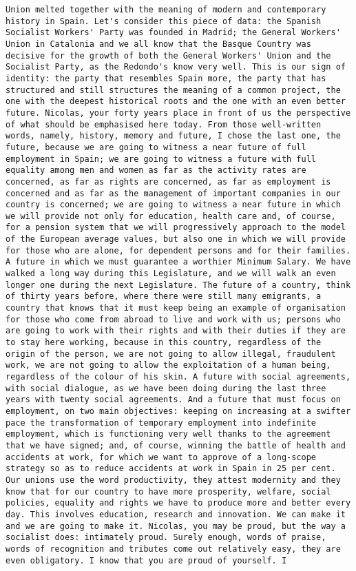 \documentclass[
]{article}
\begin{document}
\begin{verbatim}
Union melted together with the meaning of modern and contemporary history in Spain. Let's consider this piece of data: the Spanish Socialist Workers' Party was founded in Madrid; the General Workers' Union in Catalonia and we all know that the Basque Country was decisive for the growth of both the General Workers' Union and the Socialist Party, as the Redondo's know very well. This is our sign of identity: the party that resembles Spain more, the party that has structured and still structures the meaning of a common project, the one with the deepest historical roots and the one with an even better future. Nicolas, your forty years place in front of us the perspective of what should be emphasised here today. From those well-written words, namely, history, memory and future, I chose the last one, the future, because we are going to witness a near future of full employment in Spain; we are going to witness a future with full equality among men and women as far as the activity rates are concerned, as far as rights are concerned, as far as employment is concerned and as far as the management of important companies in our country is concerned; we are going to witness a near future in which we will provide not only for education, health care and, of course, for a pension system that we will progressively approach to the model of the European average values, but also one in which we will provide for those who are alone, for dependent persons and for their families. A future in which we must guarantee a worthier Minimum Salary. We have walked a long way during this Legislature, and we will walk an even longer one during the next Legislature. The future of a country, think of thirty years before, where there were still many emigrants, a country that knows that it must keep being an example of organisation for those who come from abroad to live and work with us; persons who are going to work with their rights and with their duties if they are to stay here working, because in this country, regardless of the origin of the person, we are not going to allow illegal, fraudulent work, we are not going to allow the exploitation of a human being, regardless of the colour of his skin. A future with social agreements, with social dialogue, as we have been doing during the last three years with twenty social agreements. And a future that must focus on employment, on two main objectives: keeping on increasing at a swifter pace the transformation of temporary employment into indefinite employment, which is functioning very well thanks to the agreement that we have signed; and, of course, winning the battle of health and accidents at work, for which we want to approve of a long-scope strategy so as to reduce accidents at work in Spain in 25 per cent. Our unions use the word productivity, they attest modernity and they know that for our country to have more prosperity, welfare, social policies, equality and rights we have to produce more and better every day. This involves education, research and innovation. We can make it and we are going to make it. Nicolas, you may be proud, but the way a socialist does: intimately proud. Surely enough, words of praise, words of recognition and tributes come out relatively easy, they are even obligatory. I know that you are proud of yourself. I 
\end{verbatim}
\end{document}
